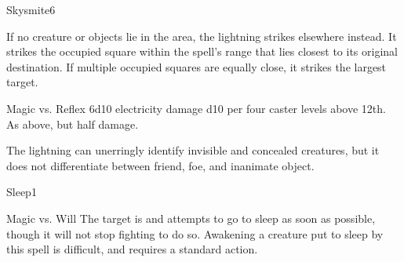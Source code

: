 \begin{spellsection}{Skysmite}{6}
\begin{spellheader}
    \spellrng{\rngext}
    \spellspecial If no creature or objects lie in the area, the lightning strikes elsewhere instead. It strikes the  occupied square within the spell's range that lies closest to its original destination. If multiple occupied squares are equally close, it strikes the largest target.
    \begin{spelltargetinginfo}
    \end{spelltargetinginfo}
\end{spellheader}
\begin{spellcontent}
    \begin{spelleffects}
        \begin{spellattack}{Magic vs. Reflex}
            \spellsuccess 6d10 electricity damage \add d10 per four caster levels above 12th.
            \spellfailure As above, but half damage.
        \end{spellattack}
    \end{spelleffects}
\end{spellcontent}
\begin{spellfooter}
    \spellnotes The lightning can unerringly identify invisible and concealed creatures, but it does not differentiate between friend, foe, and inanimate object.
\end{spellfooter}
\end{spellsection}

\begin{spellsection}{Sleep}{1}
\begin{spellheader}
    \begin{spelltargetinginfo}
    \end{spelltargetinginfo}
\end{spellheader}
\begin{spellcontent}
    \begin{spelleffects}
        \begin{spellattack}{Magic vs. Will}
            \spellsuccess The target is \fatigued and attempts to go to sleep as soon as possible, though it will not stop fighting to do so. Awakening a creature put to sleep by this spell is difficult, and requires a standard action.
        \end{spellattack}
        \spelldur \durshort
    \end{spelleffects}
\end{spellcontent}
\begin{spellfooter}
\end{spellfooter}
\end{spellsection}

